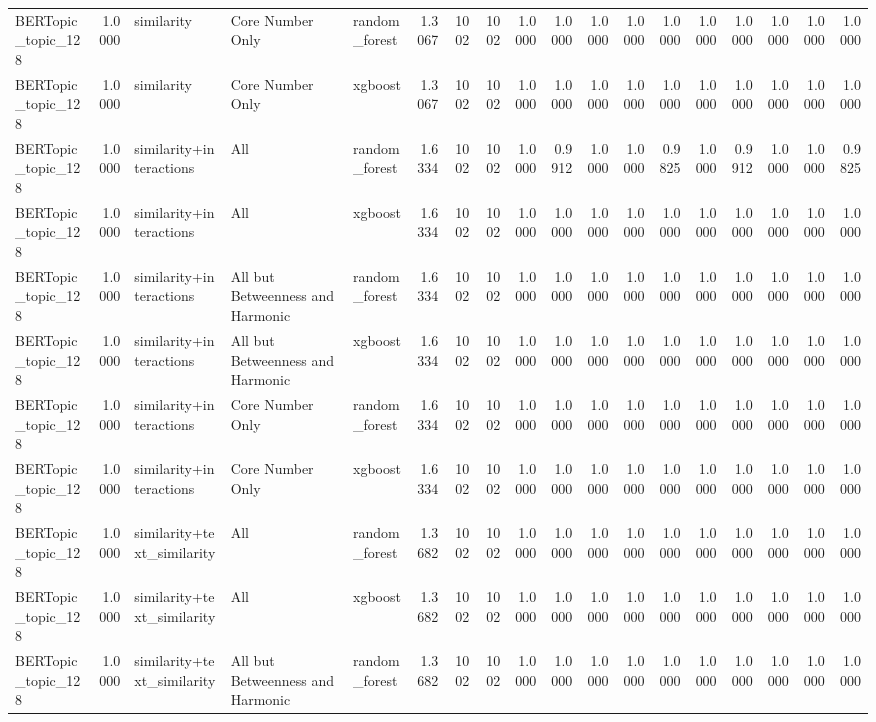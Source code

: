 \begin{tabular}{lrlllrrrrrrrrrrrrr}
BERTopic_topic_128 & 1.0000 & similarity & Core Number Only & random_forest & 1.3067 & 1002 & 1002 & 1.0000 & 1.0000 & 1.0000 & 1.0000 & 1.0000 & 1.0000 & 1.0000 & 1.0000 & 1.0000 & 1.0000 \\
BERTopic_topic_128 & 1.0000 & similarity & Core Number Only & xgboost & 1.3067 & 1002 & 1002 & 1.0000 & 1.0000 & 1.0000 & 1.0000 & 1.0000 & 1.0000 & 1.0000 & 1.0000 & 1.0000 & 1.0000 \\
BERTopic_topic_128 & 1.0000 & similarity+interactions & All & random_forest & 1.6334 & 1002 & 1002 & 1.0000 & 0.9912 & 1.0000 & 1.0000 & 0.9825 & 1.0000 & 0.9912 & 1.0000 & 1.0000 & 0.9825 \\
BERTopic_topic_128 & 1.0000 & similarity+interactions & All & xgboost & 1.6334 & 1002 & 1002 & 1.0000 & 1.0000 & 1.0000 & 1.0000 & 1.0000 & 1.0000 & 1.0000 & 1.0000 & 1.0000 & 1.0000 \\
BERTopic_topic_128 & 1.0000 & similarity+interactions & All but Betweenness and Harmonic & random_forest & 1.6334 & 1002 & 1002 & 1.0000 & 1.0000 & 1.0000 & 1.0000 & 1.0000 & 1.0000 & 1.0000 & 1.0000 & 1.0000 & 1.0000 \\
BERTopic_topic_128 & 1.0000 & similarity+interactions & All but Betweenness and Harmonic & xgboost & 1.6334 & 1002 & 1002 & 1.0000 & 1.0000 & 1.0000 & 1.0000 & 1.0000 & 1.0000 & 1.0000 & 1.0000 & 1.0000 & 1.0000 \\
BERTopic_topic_128 & 1.0000 & similarity+interactions & Core Number Only & random_forest & 1.6334 & 1002 & 1002 & 1.0000 & 1.0000 & 1.0000 & 1.0000 & 1.0000 & 1.0000 & 1.0000 & 1.0000 & 1.0000 & 1.0000 \\
BERTopic_topic_128 & 1.0000 & similarity+interactions & Core Number Only & xgboost & 1.6334 & 1002 & 1002 & 1.0000 & 1.0000 & 1.0000 & 1.0000 & 1.0000 & 1.0000 & 1.0000 & 1.0000 & 1.0000 & 1.0000 \\
BERTopic_topic_128 & 1.0000 & similarity+text_similarity & All & random_forest & 1.3682 & 1002 & 1002 & 1.0000 & 1.0000 & 1.0000 & 1.0000 & 1.0000 & 1.0000 & 1.0000 & 1.0000 & 1.0000 & 1.0000 \\
BERTopic_topic_128 & 1.0000 & similarity+text_similarity & All & xgboost & 1.3682 & 1002 & 1002 & 1.0000 & 1.0000 & 1.0000 & 1.0000 & 1.0000 & 1.0000 & 1.0000 & 1.0000 & 1.0000 & 1.0000 \\
BERTopic_topic_128 & 1.0000 & similarity+text_similarity & All but Betweenness and Harmonic & random_forest & 1.3682 & 1002 & 1002 & 1.0000 & 1.0000 & 1.0000 & 1.0000 & 1.0000 & 1.0000 & 1.0000 & 1.0000 & 1.0000 & 1.0000 \\

\end{tabular}

